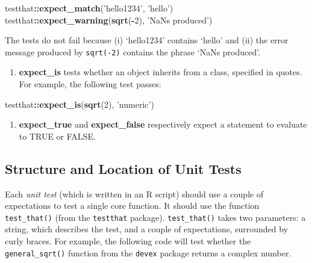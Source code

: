 \documentclass[]{book}
\newenvironment{Shaded}{\begin{snugshade}}{\end{snugshade}}
\newcommand{\KeywordTok}[1]{\textcolor[rgb]{0.13,0.29,0.53}{\textbf{#1}}}
\newcommand{\DecValTok}[1]{\textcolor[rgb]{0.00,0.00,0.81}{#1}}
\newcommand{\StringTok}[1]{\textcolor[rgb]{0.31,0.60,0.02}{#1}}
\newcommand{\OperatorTok}[1]{\textcolor[rgb]{0.81,0.36,0.00}{\textbf{#1}}}
\newcommand{\NormalTok}[1]{#1}
\providecommand{\tightlist}{%
  \setlength{\itemsep}{0pt}\setlength{\parskip}{0pt}}
\begin{document}
\begin{Shaded}
\begin{Highlighting}[]
\NormalTok{testthat}\OperatorTok{::}\KeywordTok{expect_match}\NormalTok{(}\StringTok{'hello1234'}\NormalTok{, }\StringTok{'hello'}\NormalTok{)}
\NormalTok{testthat}\OperatorTok{::}\KeywordTok{expect_warning}\NormalTok{(}\KeywordTok{sqrt}\NormalTok{(}\OperatorTok{-}\DecValTok{2}\NormalTok{), }\StringTok{'NaNs produced'}\NormalTok{)}
\end{Highlighting}
\end{Shaded}

The tests do not fail because (i) `hello1234' contains `hello' and (ii)
the error message produced by \texttt{sqrt(-2)} contains the phrase
`NaNs produced'.

\begin{enumerate}
\def\labelenumi{\arabic{enumi}.}
\setcounter{enumi}{3}
\tightlist
\item
  \textbf{expect\_is} tests whether an object inherits from a class,
  specified in quotes. For example, the following test passes:
\end{enumerate}

\begin{Shaded}
\begin{Highlighting}[]
\NormalTok{testthat}\OperatorTok{::}\KeywordTok{expect_is}\NormalTok{(}\KeywordTok{sqrt}\NormalTok{(}\DecValTok{2}\NormalTok{), }\StringTok{'numeric'}\NormalTok{)}
\end{Highlighting}
\end{Shaded}

\begin{enumerate}
\def\labelenumi{\arabic{enumi}.}
\setcounter{enumi}{4}
\tightlist
\item
  \textbf{expect\_true} and \textbf{expect\_false} respectively expect a
  statement to evaluate to TRUE or FALSE.
\end{enumerate}

\subsection{Structure and Location of Unit
Tests}\label{structure-and-location-of-unit-tests}

Each \emph{unit test} (which is written in an R script) should use a
couple of expectations to test a single core function. It should use the
function \texttt{test\_that()} (from the \texttt{testthat} package).
\texttt{test\_that()} takes two parameters: a string, which describes
the test, and a couple of expectations, surrounded by curly braces. For
example, the following code will test whether the
\texttt{general\_sqrt()} function from the \texttt{devex} package
returns a complex number.
\end{document}
